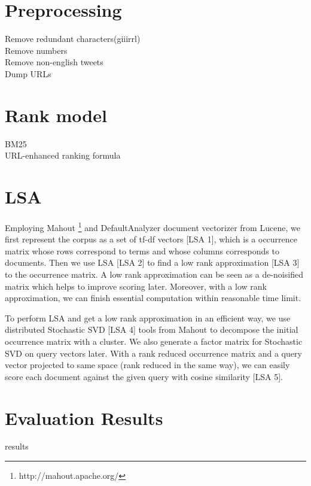 \documentclass{acm_proc_article-sp}
\begin{document}
\section{Preprocessing}
Remove redundant characters(giiirrl)\\
Remove numbers\\
Remove non-english tweets\\
Dump URLs\\

\section{Rank model}
BM25\\
URL-enhanced ranking formula

\section{LSA}
Employing Mahout \footnote{http://mahout.apache.org/} and DefaultAnalyzer document vectorizer from Lucene, we first represent the corpus as a set of tf-df vectors [LSA 1], which is a occurrence matrix whose rows correspond to terms and whose columns corresponds to documents. Then we use LSA [LSA 2] to find a low rank approximation [LSA 3] to the occurrence matrix. A low rank approximation can be seen as a de-noisified matrix which helps to improve scoring later. Moreover, with a low rank approximation, we can finish essential computation within reasonable time limit.

To perform LSA and get a low rank approximation in an efficient way, we use distributed Stochastic SVD [LSA 4] tools from Mahout to decompose the initial occurrence matrix with a cluster. We also generate a factor matrix for Stochastic SVD on query vectors later. With a rank reduced occurrence matrix and a query vector projected to same space (rank reduced in the same way), we can easily score each document against the given query with cosine similarity [LSA 5].

\section{Evaluation Results}
results\\
\end{document}
